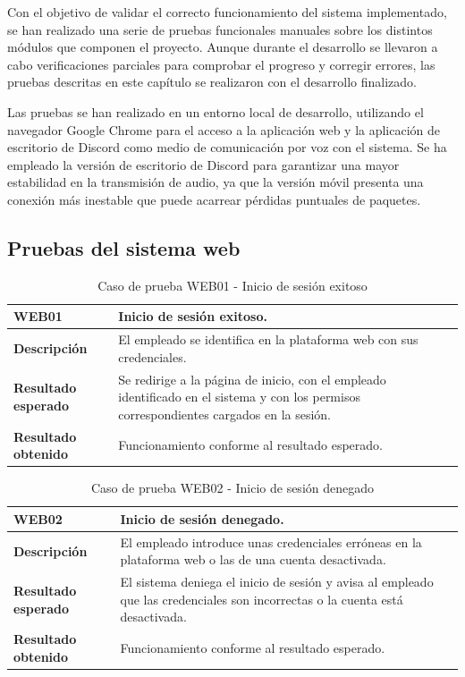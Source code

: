 Con el objetivo de validar el correcto funcionamiento del sistema implementado, se han realizado una serie de pruebas funcionales manuales sobre los distintos módulos que componen el proyecto. 
Aunque durante el desarrollo se llevaron a cabo verificaciones parciales para comprobar el progreso y corregir errores, las pruebas descritas en este capítulo se realizaron con el desarrollo finalizado. 

Las pruebas se han realizado en un entorno local de desarrollo, utilizando el navegador Google Chrome para el acceso a la aplicación web y la aplicación de escritorio de Discord como medio de comunicación por voz con el sistema. 
Se ha empleado la versión de escritorio de Discord para garantizar una mayor estabilidad en la transmisión de audio, ya que la versión móvil presenta una conexión más inestable que puede acarrear pérdidas puntuales de paquetes. 


\subsection{Pruebas del sistema web}

    \begin{table}[H]
        \centering
        \begin{tabular}{|l|p{12cm}|}
        \hline
        \textbf{WEB01} & Inicio de sesión exitoso. \\ \hline
        \textbf{Descripción} & El empleado se identifica en la plataforma web con sus credenciales. \\ \hline
        \textbf{Resultado esperado} & Se redirige a la página de inicio, con el empleado identificado en el sistema y con los permisos correspondientes cargados en la sesión. \\ \hline
        \textbf{Resultado obtenido} & Funcionamiento conforme al resultado esperado. \\ \hline
        \end{tabular}
        \caption{Caso de prueba WEB01 - Inicio de sesión exitoso}
    \end{table}

    \begin{table}[H]
        \centering
        \begin{tabular}{|l|p{12cm}|}
        \hline
        \textbf{WEB02} & Inicio de sesión denegado. \\ \hline
        \textbf{Descripción} & El empleado introduce unas credenciales erróneas en la plataforma web o las de una cuenta desactivada. \\ \hline
        \textbf{Resultado esperado} & El sistema deniega el inicio de sesión y avisa al empleado que las credenciales son incorrectas o la cuenta está desactivada. \\ \hline
        \textbf{Resultado obtenido} & Funcionamiento conforme al resultado esperado. \\ \hline
        \end{tabular}
        \caption{Caso de prueba WEB02 - Inicio de sesión denegado}
    \end{table}

